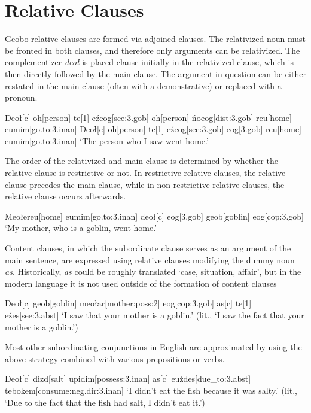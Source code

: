 \documentclass[a4paper,11pt,oneside,openany]{memoir}
\begin{document}
\section{Relative Clauses}

Geobo{\engma} relative clauses are formed via adjoined clauses. The relativized noun must be fronted in both clauses, and therefore only arguments can be relativized. The complementizer \textit{deo\l} is placed clause-initially in the relativized clause, which is then directly followed by the main clause. The argument in question can be either restated in the main clause (often with a demonstrative) or replaced with a pronoun.

\pex
\a
\begingl
Deo{\l}[{\sc c}]
oh[person]
te{\vd}[1]
\vz e\'zeog[see:{\sc 3.gob}]
\nogloss{,}
oh[person]
\'no\vd eog[{\sc dist:3.gob}]
reu[home]
eumim[go.to:{\sc 3.inan}]
\endgl
\a
\begingl
Deo{\l}[{\sc c}]
oh[person]
te{\vd}[1]
\vz e\'zeog[see:{\sc 3.gob}]
eog[{\sc 3.gob}]
reu[home]
eumim[go.to:{\sc 3.inan}]
\glft `The person who I saw went home.'
\endgl
\xe

The order of the relativized and main clause is determined by whether the relative clause is restrictive or not. In restrictive relative clauses, the relative clause precedes the main clause, while in non-restrictive relative clauses, the relative clause occurs afterwards.

\ex
\begingl
Meo\l e
reu[home]
eumim[go.to:{\sc 3.inan}]
\nogloss{,}
deo{\l}[{\sc c}]
eog[{\sc 3.gob}]
geob[goblin]
\vz eog[\sc cop:3.gob]
\glft `My mother, who is a goblin, went home.'
\endgl
\xe

Content clauses, in which the subordinate clause serves as an argument of the main sentence, are expressed using relative clauses modifying the dummy noun \textit{as}. Historically, \textit{as} could be roughly translated `case, situation, affair', but in the modern language it is not used outside of the formation of content clauses

\ex
\begingl
Deo{\l}[{\sc c}] 
geob[goblin]
meo\l ar[mother:{\sc poss:2}]
\vz eog[\sc cop:3.gob]
\nogloss{,}
as[{\sc c}]
te{\vd}[1]
\vz e\'zes[see:{\sc 3.abst}]
\glft `I saw that your mother is a goblin.' (lit., `I saw the fact that your mother is a goblin.')
\endgl
\xe

Most other subordinating conjunctions in English are approximated by using the above strategy combined with various prepositions or verbs.

\ex 
\begingl
Deo\l[\sc c]
dizd[salt]
\engma u\vz[fish]
pidim[possess:{\sc 3.inan}]
\nogloss{,}
as[\sc c]
euźdes[due\_to:{\sc 3.abst}]
te\vd[\sc 1] 
bo\vs kem[consume:{\sc neg.dir:3.inan}]
\glft `I didn't eat the fish because it was salty.' (lit., `Due to the fact that the fish had salt, I didn't eat it.')
\endgl
\xe 
\end{document}
